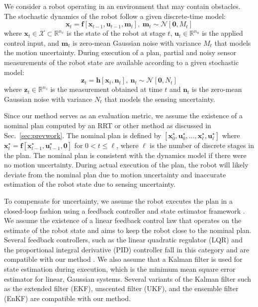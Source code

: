 
We consider a robot operating in an environment that may contain obstacles. The stochastic dynamics of the robot follow a given discrete-time model:
\begin{equation} \label{eq:dynmodel}
\mathbf{x}_{t} = \mathbf{f}[\mathbf{x}_{t-1}, \mathbf{u}_{t-1}, \mathbf{m}_t], ~ \mathbf{m}_t \sim \mathcal{N} [\mathbf{0}, M_t]
\end{equation}
where $\mathbf{x}_t \in \mathcal{X} \subset \mathbb{R}^{n_x}$ is the state of the robot at stage $t$, $\mathbf{u}_t \in \mathbb{R}^{n_u}$ is the applied control input, and $\mathbf{m}_t$ is zero-mean Gaussian noise with variance $M_t$ that models the motion uncertainty. During execution of a plan, partial and noisy sensor measurements of the robot state are available according to a given stochastic model:
\begin{equation}\label{eq:obsmodel}
\mathbf{z}_t = \mathbf{h}[\mathbf{x}_t, \mathbf{n}_t], ~ \mathbf{n}_t \sim \mathcal{N}[\mathbf{0}, N_t]
\end{equation}
where $\mathbf{z}_t \in \mathbb{R}^{n_z}$ is the measurement obtained at time $t$ and $\mathbf{n}_t$ is the zero-mean Gaussian noise with variance $N_t$ that models the sensing uncertainty.

Since our method serves as an evaluation metric, we assume the existence of a nominal plan computed by an RRT or other method as discussed in Sec.\ \ref{sec:prevwork}. The nominal plan is defined by $[\mathbf{x}^{\star}_{0}, \mathbf{u}^{\star}_{0}, \hdots, \mathbf{x}^{\star}_{\ell}, \mathbf{u}^{\star}_{\ell}]$ where $\mathbf{x}^{\star}_{t} = \mathbf{f}[\mathbf{x}^{\star}_{t-1}, \mathbf{u}^{\star}_{t-1}, \mathbf{0}]$ for $0 < t \leq \ell$, where $\ell$ is the number of discrete stages in the plan. The nominal plan is consistent with the dynamics model if there were no motion uncertainty. During actual execution of the plan, the robot will likely deviate from the nominal plan due to motion uncertainty and inaccurate estimation of the robot state due to sensing uncertainty.

To compensate for uncertainty, we assume the robot executes the plan in a closed-loop fashion using a feedback controller and state estimator framework \cite{Book:Stengel94}. We assume the existence of a linear feedback control law that operates on the estimate of the robot state and aims to keep the robot close to the nominal plan. Several feedback controllers, such as the linear quadratic regulator (LQR) and the proportional integral derivative (PID) controller fall in this category and are compatible with our method \cite{Book:Stengel94}. We also assume that a Kalman filter is used for state estimation during execution, which is the minimum mean square error estimator for linear, Gaussian systems. Several variants of the Kalman filter such as the extended filter (EKF), unscented filter (UKF), and the ensemble filter (EnKF) \cite{Book:Simon06} are compatible with our method.

